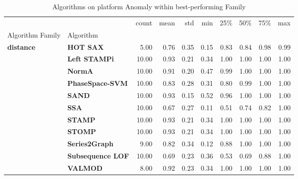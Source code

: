 \begin{table}
\caption{Algorithms on platform Anomaly within best-performing Family}
\label{tab:bp-platform}
\begin{tabular}{llrrrrrrrr}
\toprule
 &  & count & mean & std & min & 25\% & 50\% & 75\% & max \\
Algorithm Family & Algorithm &  &  &  &  &  &  &  &  \\
\midrule
\multirow[t]{11}{*}{\textbf{distance}} & \textbf{HOT SAX} & 5.00 & 0.76 & 0.35 & 0.15 & 0.83 & 0.84 & 0.98 & 0.99 \\
\textbf{} & \textbf{Left STAMPi} & 10.00 & 0.93 & 0.21 & 0.34 & 1.00 & 1.00 & 1.00 & 1.00 \\
\textbf{} & \textbf{NormA} & 10.00 & 0.91 & 0.20 & 0.47 & 0.99 & 1.00 & 1.00 & 1.00 \\
\textbf{} & \textbf{PhaseSpace-SVM} & 10.00 & 0.83 & 0.28 & 0.31 & 0.80 & 0.99 & 1.00 & 1.00 \\
\textbf{} & \textbf{SAND} & 10.00 & 0.93 & 0.15 & 0.52 & 0.96 & 1.00 & 1.00 & 1.00 \\
\textbf{} & \textbf{SSA} & 10.00 & 0.67 & 0.27 & 0.11 & 0.51 & 0.74 & 0.82 & 1.00 \\
\textbf{} & \textbf{STAMP} & 10.00 & 0.93 & 0.21 & 0.34 & 1.00 & 1.00 & 1.00 & 1.00 \\
\textbf{} & \textbf{STOMP} & 10.00 & 0.93 & 0.21 & 0.34 & 1.00 & 1.00 & 1.00 & 1.00 \\
\textbf{} & \textbf{Series2Graph} & 9.00 & 0.82 & 0.34 & 0.12 & 0.88 & 1.00 & 1.00 & 1.00 \\
\textbf{} & \textbf{Subsequence LOF} & 10.00 & 0.69 & 0.23 & 0.36 & 0.53 & 0.69 & 0.88 & 1.00 \\
\textbf{} & \textbf{VALMOD} & 8.00 & 0.92 & 0.23 & 0.34 & 1.00 & 1.00 & 1.00 & 1.00 \\
\cline{1-10}
\bottomrule
\end{tabular}
\end{table}
